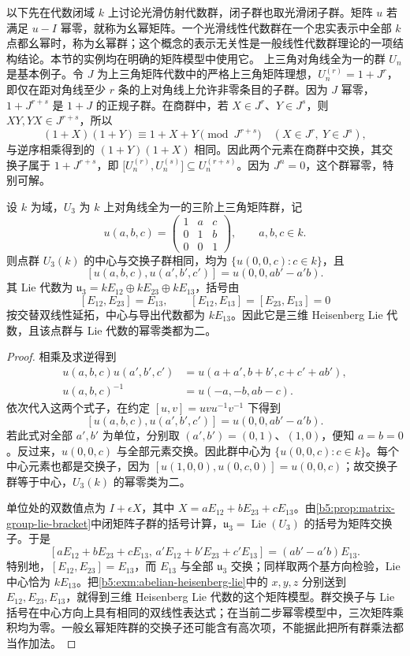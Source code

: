 以下先在代数闭域 \(k\) 上讨论光滑仿射代数群，闭子群也取光滑闭子群。矩阵 \(u\) 若满足 \(u-I\) 幂零，就称为幺幂矩阵。一个光滑线性代数群在一个忠实表示中全部 \(k\) 点都幺幂时，称为幺幂群；这个概念的表示无关性是一般线性代数群理论的一项结构结论。本节的实例均在明确的矩阵模型中使用它。
\ProseParagraphBreak
上三角对角线全为一的群 \(U_n\) 是基本例子。令 \(J\) 为上三角矩阵代数中的严格上三角矩阵理想，\(U_n^{(r)}=1+J^r\)，即仅在距对角线至少 \(r\) 条的上对角线上允许非零条目的子群。因为 \(J\) 幂零，\(1+J^{r+s}\) 是 \(1+J\) 的正规子群。在商群中，若 \(X\in J^r\)、\(Y\in J^s\)，则 \(XY,YX\in J^{r+s}\)，所以
\[
	(1+X)(1+Y)\equiv1+X+Y\pmod{J^{r+s}} \quad(X\in J^r,\ Y\in J^s),
\]
与逆序相乘得到的 \((1+Y)(1+X)\) 相同。因此两个元素在商群中交换，其交换子属于 \(1+J^{r+s}\)，即 \(\bigl[U_n^{(r)},U_n^{(s)}\bigr]\subseteq U_n^{(r+s)}\)。因为 \(J^n=0\)，这个群幂零，特别可解。
\begin{proposition}\label{b5:prop:unipotent-three-heisenberg}
	设 \(k\) 为域，\(U_3\) 为 \(k\) 上对角线全为一的三阶上三角矩阵群，记
	\[
		u(a,b,c)=\begin{pmatrix}1&a&c\\0&1&b\\0&0&1\end{pmatrix},
		\qquad a,b,c\in k.
	\]
	则点群 \(U_3(k)\) 的中心与交换子群相同，均为 \(\{u(0,0,c):c\in k\}\)，且
	\[
		[u(a,b,c),u(a',b',c')]=u(0,0,ab'-a'b).
	\]
	其 Lie 代数为 \(\mathfrak u_3=kE_{12}\oplus kE_{23}\oplus kE_{13}\)，括号由
	\[
		[E_{12},E_{23}]=E_{13},\qquad [E_{12},E_{13}]=[E_{23},E_{13}]=0
	\]
	按交替双线性延拓，中心与导出代数都为 \(kE_{13}\)。因此它是三维 Heisenberg Lie 代数，且该点群与 Lie 代数的幂零类都为二。
\end{proposition}
\begin{proof}
	相乘及求逆得到
	\[
		\begin{aligned}
			u(a,b,c)u(a',b',c')&=u(a+a',b+b',c+c'+ab'),\\
			u(a,b,c)^{-1}&=u(-a,-b,ab-c).
		\end{aligned}
	\]
	依次代入这两个式子，在约定 \([u,v]=uvu^{-1}v^{-1}\) 下得到
	\[
		[u(a,b,c),u(a',b',c')]=u(0,0,ab'-a'b).
	\]
	若此式对全部 \(a',b'\) 为单位，分别取 \((a',b')=(0,1)\)、\((1,0)\)，便知 \(a=b=0\)。反过来，\(u(0,0,c)\) 与全部元素交换。因此群中心为 \(\{u(0,0,c):c\in k\}\)。每个中心元素也都是交换子，因为 \([u(1,0,0),u(0,c,0)]=u(0,0,c)\)；故交换子群等于中心，\(U_3(k)\) 的幂零类为二。

	单位处的双数值点为 \(I+\epsilon X\)，其中 \(X=aE_{12}+bE_{23}+cE_{13}\)。由\cref{b5:prop:matrix-group-lie-bracket}中闭矩阵子群的括号计算，\(\mathfrak u_3=\operatorname{Lie}(U_3)\) 的括号为矩阵交换子。于是
	\[
		[aE_{12}+bE_{23}+cE_{13},\, a'E_{12}+b'E_{23}+c'E_{13}] =(ab'-a'b)E_{13}.
	\]
	特别地，\([E_{12},E_{23}]=E_{13}\)，而 \(E_{13}\) 与全部 \(\mathfrak u_3\) 交换；同样取两个基方向检验，Lie 中心恰为 \(kE_{13}\)。把\cref{b5:exm:abelian-heisenberg-lie}中的 \(x,y,z\) 分别送到 \(E_{12},E_{23},E_{13}\)，就得到三维 Heisenberg Lie 代数的这个矩阵模型。群交换子与 Lie 括号在中心方向上具有相同的双线性表达式；在当前二步幂零模型中，三次矩阵乘积均为零。一般幺幂矩阵群的交换子还可能含有高次项，不能据此把所有群乘法都当作加法。
\end{proof}
